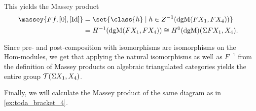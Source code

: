 \begin{example}
    This yields the Massey product
    \begin{align*}
        \massey{F f, [0], [\Id]} &= \set{\class{ h } \mid h \in Z^{-1}(\dgM(F X_1, F X_4)) } \\
        &= H^{-1}(\dgM(F X_1, F X_4)) \cong H^0(\dgM)(\Sigma F X_1, X_4).
    \end{align*}

    Since pre- and post-composition with isomorphisms are isomorphisms on the Hom-modules, we get that applying the natural isomorphisms as well as \( F^{-1} \) from the definition of Massey products on algebraic triangulated categories yields the entire group \( {\mathcal{T}}(\Sigma X_1, X_4) \).
\end{example}

Finally, we will calculate the Massey product of the same diagram as in \autoref{ex:toda_bracket_4}.

